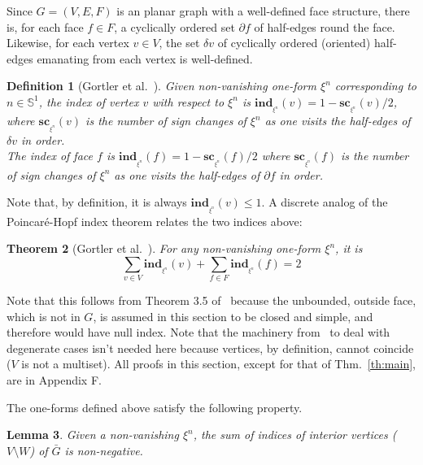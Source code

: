 \documentclass[11pt]{article}
\newtheorem{theorem}{Theorem}[section]
\newtheorem{lemma}[theorem]{Lemma}
\newtheorem{definition}[theorem]{Definition}
\begin{document}
Since $G=(V,E,F)$ is an planar graph with a well-defined face structure,
there is, for each face $f\in F$, a cyclically ordered set
$\partial f$ of half-edges round the face. 
Likewise, for each vertex $v\in V$, the set $\delta v$ of cyclically ordered
(oriented) half-edges emanating from each vertex is well-defined. 


\begin{definition}[Gortler et al.\ \cite{1form}]
Given non-vanishing one-form $\xi^n$ corresponding to $n\in\mathbb{S}^1$, 
the index of vertex $v$ with respect to $\xi^n$ is $\mathbf{ind}_{_{\xi^n}}(v) = 1 - \mathbf{sc}_{_{\xi^n}}(v) / 2$, where $\mathbf{sc}_{_{\xi^n}}(v)$ is the
number of sign changes of $\xi^n$ as one visits the half-edges of $\delta
v$ in order. \\
The index of face $f$ is $\mathbf{ind}_{_{\xi^n}}(f) = 1 - \mathbf{sc}_{_{\xi^n}}(f)/2$ where $\mathbf{sc}_{_{\xi^n}}(f)$ is the number
of sign changes of $\xi^n$ as one visits the half-edges of $\partial f$ in
order. 
\end{definition}

Note that, by definition, it is always $\mathbf{ind}_{_{\xi^n}}(v) \le 1$. 
A discrete analog of the Poincar\'e-Hopf index theorem relates 
the two indices above:

\begin{theorem}[Gortler et al.\ \cite{1form}]\label{lem:ph}
For any non-vanishing one-form $\xi^n$, it is 
\[ \displaystyle{\sum_{v\in V} \mathbf{ind}_{_{\xi^n}}(v) + \sum_{f\in F} \mathbf{ind}_{_{\xi^n}}(f) = 2} \]
\end{theorem}

Note that this follows from Theorem 3.5 of~\cite{1form} because the unbounded, 
outside face, which is not in $G$, is assumed in this section to be closed and simple, and therefore would have null index. Note that the machinery from~\cite{1form} to deal with degenerate cases
isn't needed here because vertices, by definition, cannot coincide ($V$ is not a multiset). 
All  proofs in this section, except for that of Thm.~\ref{th:main}, are  in Appendix F. 





The one-forms defined above satisfy the following property. 

\begin{lemma}\label{lem:non-negative}
	Given a non-vanishing $\xi^n$, the sum of indices of interior vertices ($V\setminus W$) of $\bar{G}$ is non-negative. 
\end{lemma}
\end{document}

